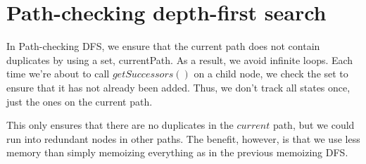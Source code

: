 \documentclass[a4paper]{report}
\begin{document}
\section{Path-checking depth-first search}

In Path-checking DFS, we ensure that the current path does not contain duplicates by using a set, currentPath. As a result,
we avoid infinite loops. Each time we're about to call $getSuccessors()$ on a child node, we check the set
to ensure that it has not already been added. Thus, we don't track all states once, just the ones on the 
current path. 

This only ensures that there are no duplicates in the $current$ path, but we could run into redundant 
nodes in other paths. The benefit, however, is that we use less memory than simply memoizing everything
as in the previous memoizing DFS. 
\end{document}
